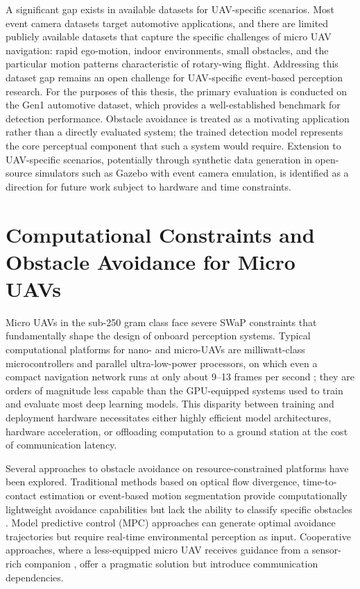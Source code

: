 \documentclass[11pt, a4paper]{report}
\begin{document}
A significant gap exists in available datasets for UAV-specific scenarios. Most event camera datasets target automotive applications, and there are limited publicly available datasets that capture the specific challenges of micro UAV navigation: rapid ego-motion, indoor environments, small obstacles, and the particular motion patterns characteristic of rotary-wing flight. Addressing this dataset gap remains an open challenge for UAV-specific event-based perception research. For the purposes of this thesis, the primary evaluation is conducted on the Gen1 automotive dataset, which provides a well-established benchmark for detection performance. Obstacle avoidance is treated as a motivating application rather than a directly evaluated system; the trained detection model represents the core perceptual component that such a system would require. Extension to UAV-specific scenarios, potentially through synthetic data generation in open-source simulators such as Gazebo with event camera emulation, is identified as a direction for future work subject to hardware and time constraints. 

\section{Computational Constraints and Obstacle Avoidance for Micro UAVs}
Micro UAVs in the sub-250 gram class face severe SWaP constraints that fundamentally shape the design of onboard perception systems. Typical computational platforms for nano- and micro-UAVs are milliwatt-class microcontrollers and parallel ultra-low-power processors, on which even a compact navigation network runs at only about 9--13 frames per second \cite{niculescu2021improving}; they are orders of magnitude less capable than the GPU-equipped systems used to train and evaluate most deep learning models. This disparity between training and deployment hardware necessitates either highly efficient model architectures, hardware acceleration, or offloading computation to a ground station at the cost of communication latency. 

Several approaches to obstacle avoidance on resource-constrained platforms have been explored. Traditional methods based on optical flow divergence, time-to-contact estimation or event-based motion segmentation provide computationally lightweight avoidance capabilities but lack the ability to classify specific obstacles \cite{decroon2016monocular, falanga2020dynamic}. Model predictive control (MPC) approaches can generate optimal avoidance trajectories but require real-time environmental perception as input. Cooperative approaches, where a less-equipped micro UAV receives guidance from a sensor-rich companion \cite{pritzl2024drones}, offer a pragmatic solution but introduce communication dependencies. 
\end{document}
